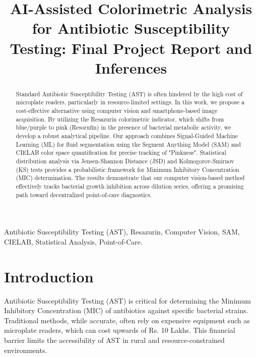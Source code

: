 \documentclass[conference]{IEEEtran}
\begin{document}
\title{AI-Assisted Colorimetric Analysis for Antibiotic Susceptibility Testing: Final Project Report and Inferences}

\author{
  \and
}

\maketitle

\begin{abstract}
Standard Antibiotic Susceptibility Testing (AST) is often hindered by the high cost of microplate readers, particularly in resource-limited settings. In this work, we propose a cost-effective alternative using computer vision and smartphone-based image acquisition. By utilizing the Resazurin colorimetric indicator, which shifts from blue/purple to pink (Resorufin) in the presence of bacterial metabolic activity, we develop a robust analytical pipeline. Our approach combines Signal-Guided Machine Learning (ML) for fluid segmentation using the Segment Anything Model (SAM) and CIELAB color space quantification for precise tracking of "Pinkness". Statistical distribution analysis via Jensen-Shannon Distance (JSD) and Kolmogorov-Smirnov (KS) tests provides a probabilistic framework for Minimum Inhibitory Concentration (MIC) determination. The results demonstrate that our computer vision-based method effectively tracks bacterial growth inhibition across dilution series, offering a promising path toward decentralized point-of-care diagnostics.
\end{abstract}

\begin{IEEEkeywords}
Antibiotic Susceptibility Testing (AST), Resazurin, Computer Vision, SAM, CIELAB, Statistical Analysis, Point-of-Care.
\end{IEEEkeywords}

\section{Introduction}
Antibiotic Susceptibility Testing (AST) is critical for determining the Minimum Inhibitory Concentration (MIC) of antibiotics against specific bacterial strains. Traditional methods, while accurate, often rely on expensive equipment such as microplate readers, which can cost upwards of Rs. 10 Lakhs. This financial barrier limits the accessibility of AST in rural and resource-constrained environments.
\end{document}

